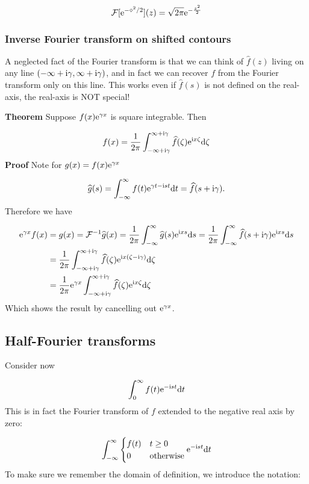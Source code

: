 \documentclass[12pt,a4paper]{article}
\def\D{ {\rm d} }
\def\I{ {\rm i} }
\def\E{ {\rm e} }
\def\FF{ {\cal F} }
\def\dt{\D t}
\begin{document}
\[
\FF[\E^{-\diamond^2/2}](z) = \sqrt{2\pi} \E^{-{z^2 \over 2}}
\]
\subsubsection{Inverse Fourier transform on shifted contours}
A neglected fact of the Fourier transform is that we can think of $\hat f(z)$ living on any line $(-\infty + \I \gamma, \infty+\I \gamma)$, and in fact we can recover $f$ from the Fourier transform only on this line. This works even if $\hat f(s)$ is not defined on the real-axis, the real-axis is NOT special!

\textbf{Theorem} Suppose $f(x) \E^{\gamma x}$ is square integrable. Then

\[
f(x) = {1 \over 2 \pi} \int_{-\infty+\I \gamma}^{\infty + \I \gamma} \widehat f(\zeta) \E^{\I x \zeta} \D \zeta
\]
\textbf{Proof}  Note for $g(x) = f(x) \E^{\gamma x}$

\[
\widehat g(s) = \int_{-\infty}^\infty f(t) \E^{\gamma t - \I s t} \dt = \widehat f(s + \I \gamma).
\]
Therefore we have


\begin{align*}
\E^{\gamma x} f(x) &= g(x) = \FF^{-1} \widehat g(x) = {1 \over 2 \pi} \int_{-\infty}^{\infty} \widehat g(s) \E^{\I x s} \D s  ={1 \over 2 \pi} \int_{-\infty}^{\infty} \widehat f(s + \I \gamma) \E^{\I x s} \D s \\
   & = {1 \over 2 \pi} \int_{-\infty+ \I \gamma}^{\infty+ \I \gamma} \widehat f(\zeta) \E^{\I x (\zeta - \I \gamma)} \D \zeta \\
    &= {1 \over 2 \pi}
   \E^{\gamma x}  \int_{-\infty+ \I \gamma}^{\infty+ \I \gamma} \widehat f(\zeta) \E^{\I x \zeta} \D \zeta
\end{align*}
Which shows the result by cancelling out $\E^{\gamma x}$.

\subsection{Half-Fourier transforms}
Consider now

\[
\int_0^\infty f(t) \E^{-\I s t} \dt
\]
This is in fact the Fourier transform of $f$ extended to the negative real axis by zero:

\[
\int_{-\infty}^\infty \begin{cases}f(t) & t \geq 0 \\ 0 & \hbox{otherwise} \end{cases} \E^{-\I s t} \dt
\]
To make sure we remember the domain of definition, we introduce the notation:
\end{document}
